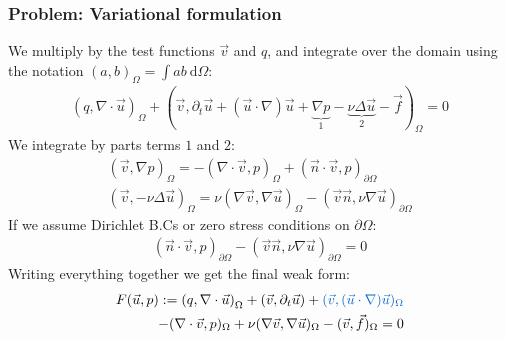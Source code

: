 \begin{frame}
	\frametitle{\textbf{Problem: Variational formulation}}
	We multiply by the test functions $\vec{v}$ and $q$, and integrate over the domain using the notation $(a, b)_{\Omega} = \int a b \ \text{d}\Omega$:
	\begin{align*}
		\left( q, \nabla \cdot \vec{u} \right)_{\Omega} + (\vec{v}, \partial_t \vec{u} + (\vec{u} \cdot \nabla) \vec{u} + \underbrace{\nabla p}_{1} - \underbrace{\nu \Delta \vec{u}}_{2} - \vec{f} )_{\Omega} = 0
	\end{align*}
	We integrate by parts terms $1$ and $2$:
	\begin{align*}
		(\vec{v}, \nabla p)_{\Omega} = - (\nabla \cdot \vec{v}, p)_{\Omega} + ( \vec{n} \cdot \vec{v}, p)_{\partial\Omega} \\
		(\vec{v}, -\nu \Delta \vec{u})_{\Omega} = \nu (\nabla \vec{v}, \nabla \vec{u})_{\Omega} - (\vec{v} \vec{n}, \nu \nabla \vec{u})_{\partial\Omega} 
	\end{align*}
	If we assume Dirichlet B.Cs or zero stress conditions on $\partial\Omega$:
	\begin{align*}
		( \vec{n} \cdot \vec{v}, p)_{\partial\Omega} - (\vec{v} \vec{n}, \nu \nabla \vec{u})_{\partial\Omega} = 0
	\end{align*}
	Writing everything together we get the final weak form:
	\begin{align*}
		F(\vec{u}, p) := \left( q, \nabla \cdot \vec{u} \right)_{\Omega} + (\vec{v}, \partial_t \vec{u})  + \textcolor{maincolor}{(\vec{v}, (\vec{u} \cdot \nabla) \vec{u})_{\Omega}} \\
		- (\nabla \cdot \vec{v}, p)_{\Omega} + \nu (\nabla \vec{v}, \nabla \vec{u})_{\Omega} - (\vec{v}, \vec{f})_{\Omega}  = 0
	\end{align*}
\end{frame}

